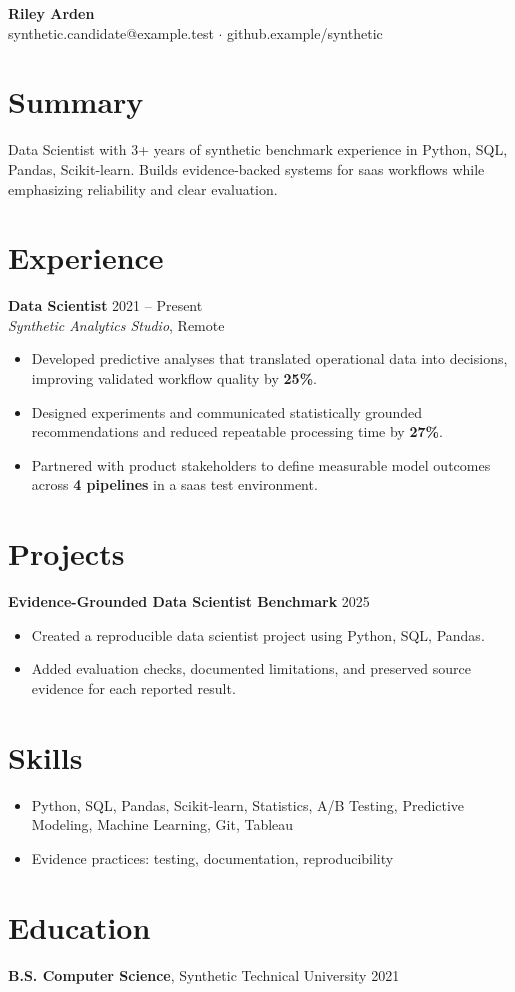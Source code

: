 \documentclass[10pt,letterpaper]{article}
\begin{document}
\begin{center}
{\Large \textbf{Riley Arden}}\\
synthetic.candidate@example.test $\cdot$ github.example/synthetic
\end{center}

\section*{Summary}
Data Scientist with 3+ years of synthetic benchmark experience in Python, SQL, Pandas, Scikit-learn. Builds evidence-backed systems for saas workflows while emphasizing reliability and clear evaluation.

\section*{Experience}
\textbf{Data Scientist} \hfill 2021 -- Present\\
\textit{Synthetic Analytics Studio}, Remote
\begin{itemize}
  \item Developed predictive analyses that translated operational data into decisions, improving validated workflow quality by \textbf{25\%}.
  \item Designed experiments and communicated statistically grounded recommendations and reduced repeatable processing time by \textbf{27\%}.
  \item Partnered with product stakeholders to define measurable model outcomes across \textbf{4 pipelines} in a saas test environment.
\end{itemize}

\section*{Projects}
\textbf{Evidence-Grounded Data Scientist Benchmark} \hfill 2025
\begin{itemize}
  \item Created a reproducible data scientist project using Python, SQL, Pandas.
  \item Added evaluation checks, documented limitations, and preserved source evidence for each reported result.
\end{itemize}

\section*{Skills}
\begin{itemize}
  \item Python, SQL, Pandas, Scikit-learn, Statistics, A/B Testing, Predictive Modeling, Machine Learning, Git, Tableau
  \item Evidence practices: testing, documentation, reproducibility
\end{itemize}

\section*{Education}
\textbf{B.S. Computer Science}, Synthetic Technical University \hfill 2021
\end{document}
